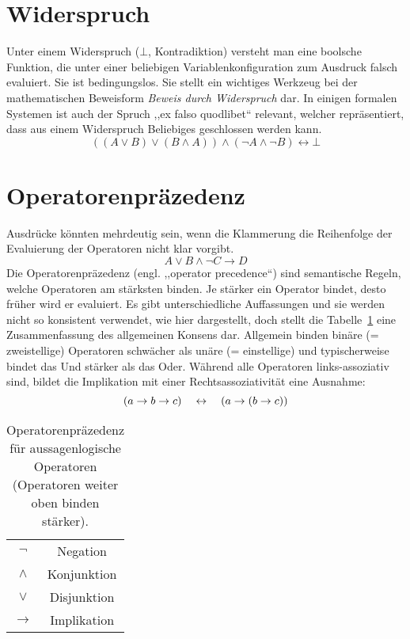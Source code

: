 \section{Widerspruch}
%
Unter einem Widerspruch ($\bot$, Kontradiktion) versteht man eine boolsche Funktion, die unter einer beliebigen Variablenkonfiguration zum Ausdruck falsch evaluiert. Sie ist bedingungslos. Sie stellt ein wichtiges Werkzeug bei der mathematischen Beweisform \emph{Beweis durch Widerspruch} dar. In einigen formalen Systemen ist auch der Spruch ,,ex falso quodlibet`` relevant, welcher repräsentiert, dass aus einem Widerspruch Beliebiges geschlossen werden kann.
%
\begin{equation}
  ((A \lor B) \lor (B \land A)) \land (\neg A \land \neg B) \leftrightarrow \bot
\end{equation}

\section{Operatorenpräzedenz}
%
Ausdrücke könnten mehrdeutig sein, wenn die Klammerung die Reihenfolge der Evaluierung der Operatoren nicht klar vorgibt.
%
\[
  A \lor B \land \neg C \rightarrow D
\]
%
Die Operatorenpräzedenz (engl. ,,operator precedence``) sind semantische Regeln, welche Operatoren am stärksten binden. Je stärker ein Operator bindet, desto früher wird er evaluiert. Es gibt unterschiedliche Auffassungen und sie werden nicht so konsistent verwendet, wie hier dargestellt, doch stellt die Tabelle~\ref{tab:op_precedence} eine Zusammenfassung des allgemeinen Konsens dar. Allgemein binden binäre (= zweistellige) Operatoren schwächer als unäre (= einstellige) und typischerweise bindet das Und stärker als das Oder. Während alle Operatoren links-assoziativ sind, bildet die Implikation mit einer Rechtsassoziativität eine Ausnahme:
\begin{equation}
  (a \rightarrow b \rightarrow c) \quad\leftrightarrow\quad (a \rightarrow (b \rightarrow c))
\end{equation}

\begin{table}[ht]
 \begin{center}
  \begin{tabular}{cc}
   $\neg$        & Negation \\
   $\land$       & Konjunktion \\
   $\lor$        & Disjunktion \\
   $\rightarrow$ & Implikation
  \end{tabular}
  \caption{Operatorenpräzedenz für aussagenlogische Operatoren
           (Operatoren weiter oben binden stärker).}
  \label{tab:op_precedence}
 \end{center}
\end{table}

